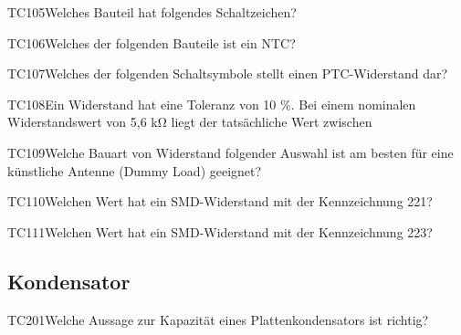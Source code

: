 \begin{question}{TC105}{Welches Bauteil hat folgendes Schaltzeichen?}
\end{question}

\begin{question}{TC106}{Welches der folgenden Bauteile ist ein NTC?}
\end{question}

\begin{question}{TC107}{Welches der folgenden Schaltsymbole stellt einen PTC-Widerstand dar?}
\end{question}

\begin{question}{TC108}{Ein Widerstand hat eine Toleranz von 10 \%. Bei einem nominalen Widerstandswert von 5,6 kΩ liegt der tatsächliche Wert zwischen}
\end{question}

\begin{question}{TC109}{Welche Bauart von Widerstand folgender Auswahl ist am besten für eine künstliche Antenne (Dummy Load) geeignet?}
\end{question}

\begin{question}{TC110}{Welchen Wert hat ein SMD-Widerstand mit der Kennzeichnung 221?}
\end{question}

\begin{question}{TC111}{Welchen Wert hat ein SMD-Widerstand mit der Kennzeichnung 223?}
\end{question}

\subsection{Kondensator}

\begin{question}{TC201}{Welche Aussage zur Kapazität eines Plattenkondensators ist richtig?}
\end{question}

